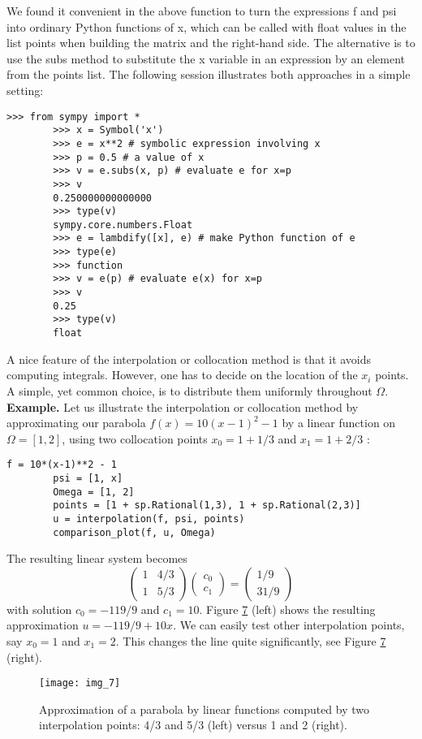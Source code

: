 \documentclass[../main.tex]{subfiles}
\begin{document}
	We found it convenient in the above function to turn the expressions f
	and psi into ordinary Python functions of x, which can be called with float
	values in the list points when building the matrix and the right-hand side.
	The alternative is to use the subs method to substitute the x variable in an
	expression by an element from the points list. The following session illustrates
	both approaches in a simple setting:\\
	\begin{lstlisting}[numbers=none]
		>>> from sympy import *
		>>> x = Symbol('x')
		>>> e = x**2 # symbolic expression involving x
		>>> p = 0.5 # a value of x
		>>> v = e.subs(x, p) # evaluate e for x=p
		>>> v
		0.250000000000000
		>>> type(v)
		sympy.core.numbers.Float
		>>> e = lambdify([x], e) # make Python function of e
		>>> type(e)
		>>> function
		>>> v = e(p) # evaluate e(x) for x=p
		>>> v
		0.25
		>>> type(v)
		float	
	\end{lstlisting}
	A nice feature of the interpolation or collocation method is that it avoids computing integrals. However, one has to decide on the location of the $x_{i}$ points. A simple, yet common choice, is to distribute them uniformly throughout $\Omega$.
	\bigbreak
	\noindent \textbf{Example.} Let us illustrate the interpolation or collocation method by approximating our parabola $f(x)=10(x-1)^{2}-1$ by a linear function on $\Omega=[1,2]$, using two collocation points $x_{0}=1+1 / 3$ and $x_{1}=1+2 / 3$ :
	\begin{lstlisting}[numbers=none]
		f = 10*(x-1)**2 - 1
		psi = [1, x]
		Omega = [1, 2]
		points = [1 + sp.Rational(1,3), 1 + sp.Rational(2,3)]
		u = interpolation(f, psi, points)
		comparison_plot(f, u, Omega)		
	\end{lstlisting}
	The resulting linear system becomes
	$$
	\left(\begin{array}{ll}
		1 & 4 / 3 \\
		1 & 5 / 3
	\end{array}\right)\left(\begin{array}{l}
		c_{0} \\
		c_{1}
	\end{array}\right)=\left(\begin{array}{l}
		1 / 9 \\
		31 / 9
	\end{array}\right)
	$$
	with solution $c_{0}=-119 / 9$ and $c_{1}=10$. Figure \hyperref[fig:img_7]{7} (left) shows the resulting approximation $u=-119 / 9+10 x$. We can easily test other interpolation points, say $x_{0}=1$ and $x_{1}=2$. This changes the line quite significantly, see Figure \hyperref[fig:img_7]{7} (right).
	\begin{figure}[H]
		\centering
		\texttt{[image: img\_7]}
		\caption{Approximation of a parabola by linear functions computed by two
			interpolation points: 4/3 and 5/3 (left) versus 1 and 2 (right).}
		\label{fig:img_7}
	\end{figure}
\end{document}
